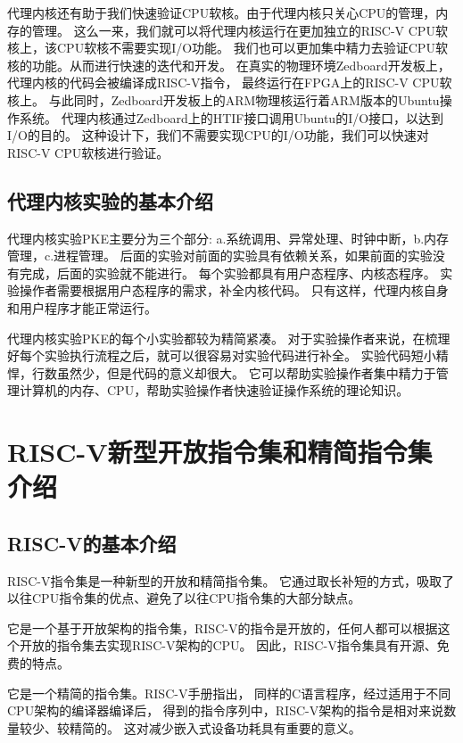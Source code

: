 代理内核还有助于我们快速验证CPU软核。由于代理内核只关心CPU的管理，内存的管理。
这么一来，我们就可以将代理内核运行在更加独立的RISC-V CPU软核上，该CPU软核不需要实现I/O功能。
我们也可以更加集中精力去验证CPU软核的功能。从而进行快速的迭代和开发。
在真实的物理环境Zedboard开发板上，
代理内核的代码会被编译成RISC-V指令，
最终运行在FPGA上的RISC-V CPU软核上。
与此同时，Zedboard开发板上的ARM物理核运行着ARM版本的Ubuntu操作系统。
代理内核通过Zedboard上的HTIF接口调用Ubuntu的I/O接口，以达到I/O的目的。
这种设计下，我们不需要实现CPU的I/O功能，我们可以快速对RISC-V CPU软核进行验证。\cite{郭勇2019RISC}

\subsection{代理内核实验的基本介绍}

代理内核实验PKE主要分为三个部分:
a.系统调用、异常处理、时钟中断，b.内存管理，c.进程管理。
后面的实验对前面的实验具有依赖关系，如果前面的实验没有完成，后面的实验就不能进行。
每个实验都具有用户态程序、内核态程序。
实验操作者需要根据用户态程序的需求，补全内核代码。
只有这样，代理内核自身和用户程序才能正常运行。

代理内核实验PKE的每个小实验都较为精简紧凑。
对于实验操作者来说，在梳理好每个实验执行流程之后，就可以很容易对实验代码进行补全。
实验代码短小精悍，行数虽然少，但是代码的意义却很大。
它可以帮助实验操作者集中精力于管理计算机的内存、CPU，帮助实验操作者快速验证操作系统的理论知识。


\section{RISC-V新型开放指令集和精简指令集介绍}

\subsection{RISC-V的基本介绍}

RISC-V指令集是一种新型的开放和精简指令集。
它通过取长补短的方式，吸取了以往CPU指令集的优点、避免了以往CPU指令集的大部分缺点。

它是一个基于开放架构的指令集，RISC-V的指令是开放的，任何人都可以根据这个开放的指令集去实现RISC-V架构的CPU。
因此，RISC-V指令集具有开源、免费的特点。

它是一个精简的指令集。RISC-V手册指出，
同样的C语言程序\cite{2006IEEE}，经过适用于不同CPU架构的编译器编译后，
得到的指令序列中，RISC-V架构的指令是相对来说数量较少、较精简的。
这对减少嵌入式设备功耗具有重要的意义。\cite{2014The}

